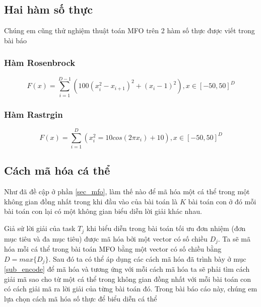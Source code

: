 \documentclass[a4paper,12pt]{report}
\begin{document}
\subsection{Hai hàm số thực} 

Chúng em cũng thử nghiệm thuật toán MFO trên 2 hàm số thực được viết trong bài báo \cite{MFO-function}
\subsubsection{Hàm Rosenbrock} 

$$F(x)=\sum_{i=1}^{D-1}(100(x_i^2-x_{i+1})^2+(x_i-1)^2),x \in [-50,50]^D $$
\subsubsection{Hàm Rastrgin}
$$F(x)=\sum_{i=1}^D(x_i^2=10cos(2\pi x_i)+10),x \in [-50,50]^D$$

\subsection{Cách mã hóa cá thể}
Như đã đề cập ở phần \ref{sec_mfo}, làm thế nào để mã hóa một cá thể trong một không gian đồng nhất trong khi đầu vào của bài toán là $K$ bài toán con ở đó mỗi bài toán con lại có một không gian biểu diễn lời giải khác nhau.
\par Giả sử lời giải của task $T_j$ khi biểu diễn trong bài toán tối ưu đơn nhiệm (đơn mục tiêu và đa mục tiêu) được mã hóa bởi một vector có số chiều $D_j$. Ta sẽ mã hóa mỗi cá thể trong bài toán MFO bằng một vector có số chiều bằng $D = max\{D_j\}$. Sau đó ta có thể áp dụng các cách mã hóa đã trình bày ở mục \ref{sub_encode}  để mã hóa và tương ứng với mỗi cách mã hóa ta sẽ phải tìm cách giải mã sao cho từ một cá thể trong không gian đồng nhất với mỗi bài toán con có cách giải mã ra lời giải của từng bài toán đó. Trong bài báo cáo này, chúng em lựa chọn cách mã hóa số thực để biểu diễn cá thể
\end{document}
